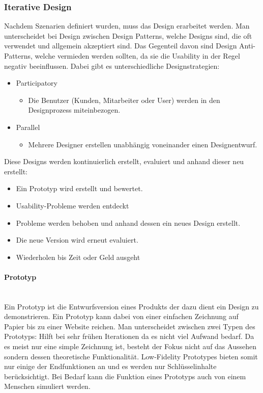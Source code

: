 \documentclass{article}
\newcommand{\paragraphlb}[1]{\paragraph{#1}\mbox{}\\}
\begin{document}
	\subsubsection{Iterative Design}
	Nachdem Szenarien definiert wurden, muss das Design erarbeitet werden. Man unterscheidet bei Design zwischen Design Patterns, welche Designs sind, die oft verwendet und allgemein akzeptiert sind. Das Gegenteil davon sind Design Anti-Patterns, welche vermieden werden sollten, da sie die Usability in der Regel negativ beeinflussen. Dabei gibt es unterschiedliche Designstrategien:
	\begin{itemize}
		\item{Participatory}
		\begin{itemize}
			\item{Die Benutzer (Kunden, Mitarbeiter oder User) werden in den Designprozess miteinbezogen.}
		\end{itemize}
		\item{Parallel}
		\begin{itemize}
			\item{Mehrere Designer erstellen unabhängig voneinander einen Designentwurf.}
		\end{itemize}
	\end{itemize}
	Diese Designs werden kontinuierlich erstellt, evaluiert und anhand dieser neu erstellt:
	\begin{itemize}
		\item{Ein Prototyp wird erstellt und bewertet.}
		\item{Usability-Probleme werden entdeckt}
		\item{Probleme werden behoben und anhand dessen ein neues Design erstellt.}
		\item{Die neue Version wird erneut evaluiert.}
		\item{Wiederholen bis Zeit oder Geld ausgeht}
	\end{itemize}
	\paragraphlb{Prototyp}
	Ein Prototyp ist die Entwurfsversion eines Produkts der dazu dient ein Design zu demonstrieren. Ein Prototyp kann dabei von einer einfachen Zeichnung auf Papier bis zu einer Website reichen. Man unterscheidet zwischen zwei Typen des Prototyps:
	Hilft bei sehr frühen Iterationen da es nicht viel Aufwand bedarf. Da es meist nur eine simple Zeichnung ist, besteht der Fokus nicht auf das Aussehen sondern dessen theoretische Funktionalität. Low-Fidelity Prototypes bieten somit nur einige der Endfunktionen an und es werden nur Schlüsselinhalte berücksichtigt. Bei Bedarf kann die Funktion eines Prototyps auch von einem Menschen simuliert werden.
\end{document}
